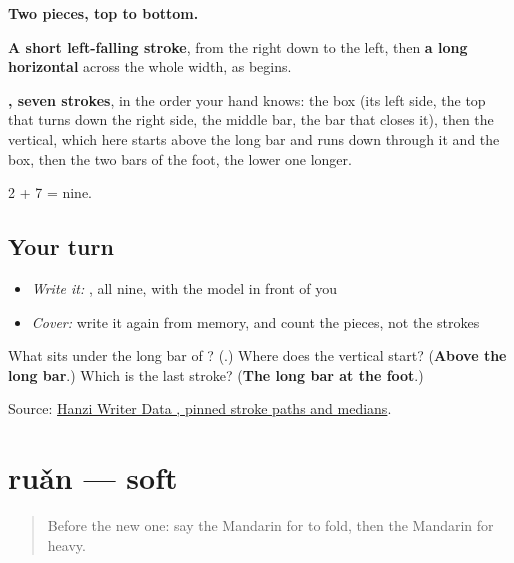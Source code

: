 \begin{quote}
\end{quote}

\textbf{Two pieces, top to bottom.}

\textbf{A short left-falling stroke}, from the right down to the left, then \textbf{a long horizontal} across the whole width, as  begins.

\textbf{, seven strokes}, in the order your hand knows: the box (its left side, the top that turns down the right side, the middle bar, the bar that closes it), then the vertical, which here starts above the long bar and runs down through it and the box, then the two bars of the foot, the lower one longer.

2 + 7 = nine.

\subsection*{Your turn}
\begin{itemize}
\raggedright
  \item \emph{Write it:} , all nine, with the model in front of you
  \item \emph{Cover:} write it again from memory, and count the pieces, not the strokes
\end{itemize}

\begin{tcolorbox}[breakable,colback=teal!4,colframe=teal!35!black,title={Before you move on}]
What sits under the long bar of ? (\textbf{}.) Where does the vertical start? (\textbf{Above the long bar}.) Which is the last stroke? (\textbf{The long bar at the foot}.)

Source: \href{https://raw.githubusercontent.com/chanind/hanzi-writer-data/68d10a4b21150cae5e1ebbd223eed289cf32d90c/data/\%E9\%87\%8D.json}{Hanzi Writer Data , pinned stroke paths and medians}.
\end{tcolorbox}
\section[ruǎn]{ruǎn — soft}

\label{lesson:ZH-C134-ruan}



\begin{quote}
Before the new one: say the Mandarin for to fold, then the Mandarin for heavy.
\end{quote}

